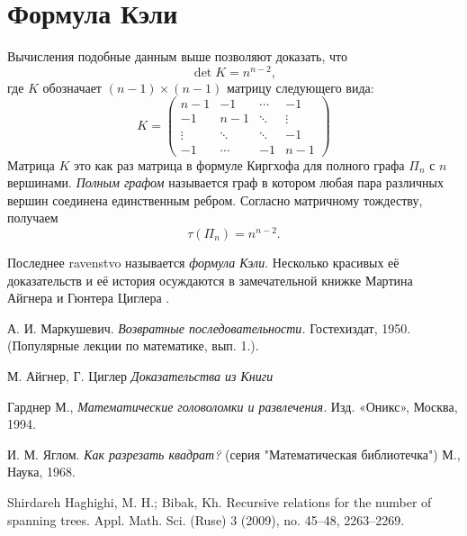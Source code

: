 \documentclass{article}
\begin{document}
\section{Формула Кэли}

Вычисления подобные данным выше позволяют доказать, что
\[\det K=n^{n-2},\]
где $K$ обозначает $(n-1)\times (n-1)$ матрицу следующего вида:
\[
K=\left(
\begin{matrix}
n{-}1&-1&\cdots&-1
\\
-1&n{-}1&\ddots&\vdots
\\
\vdots&\ddots&\ddots&-1
\\
-1&\cdots&-1&n{-}1
\end{matrix}
\right)
\]
Матрица $K$ это как раз матрица в формуле Киргхофа для полного графа $\Pi_n$ с $n$ вершинами.
\emph{Полным графом} называется граф в котором любая пара различных вершин соединена единственным ребром.
Согласно матричному тождеству, получаем 
\[\tau(\Pi_n)=n^{n-2}.\]

Последнее ravenstvo называется \emph{формула Кэли}.
Несколько красивых её доказательств и её история осуждаются в замечательной книжке Мартина Айгнера и Гюнтера Циглера \cite[Глава 30]{aigner-ziegler}.

\begin{thebibliography}{52}
А. И. Маркушевич. 
\emph{Возвратные последовательности.} 
Гостехиздат, 1950. (Популярные лекции по математике, вып. 1.).

 М. Айгнер, Г. Циглер \emph{Доказательства из Книги}

 Гарднер М., \emph{Математические головоломки и развлечения.}  Изд. «Оникс», Москва, 1994.

И. М. Яглом.
\emph{Как разрезать квадрат?}
(серия "Математическая библиотечка")
М., Наука, 1968.

 Shirdareh Haghighi, M. H.; Bibak, Kh.
Recursive relations for the number of spanning trees. 
Appl. Math. Sci. (Ruse) 3 (2009), no. 45--48, 2263--2269. 
\end{thebibliography}
\end{document}
